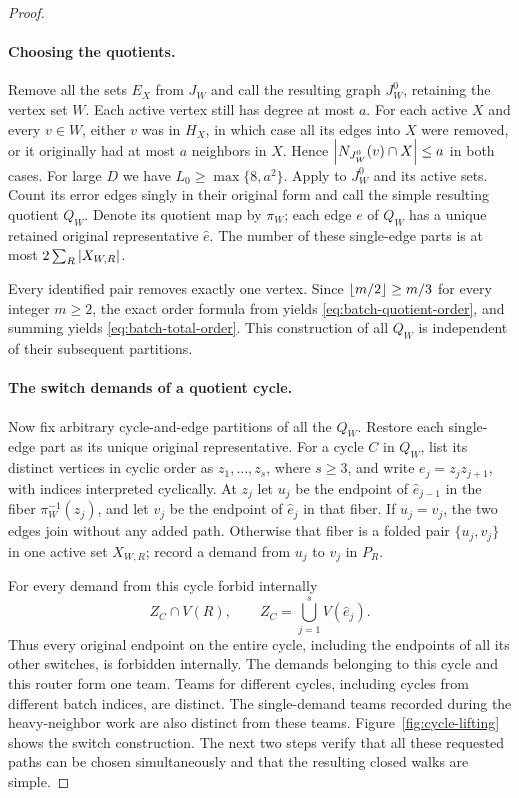 \begin{proof}
\paragraph{Choosing the quotients.}
Remove all the sets $E_X$ from $J_W$ and call the resulting graph $J_W^0$,
retaining the vertex set $W$.  Each active vertex still has degree at
most $a$.  For each active $X$ and every $v\in W$, either $v$ was in
$H_X$, in which case all its edges into $X$ were removed, or it originally
had at most $a$ neighbors in $X$.  Hence
$\left|N_{J_W^0}(v)\cap X\right|\le a$ in both cases.
For large $D$ we have $L_0\ge\max\{8,a^2\}$.  Apply
 to $J_W^0$ and its active sets.  Count its error
edges singly in their original form and call the simple resulting
quotient $Q_W$.  Denote its quotient map by $\pi_W$; each edge $e$ of
$Q_W$ has a unique retained original representative $\widehat e$.
The number of these single-edge parts is at most
$2\sum_R\left|X_{W,R}\right|$.

Every identified pair removes exactly one vertex.  Since
$\left\lfloor m/2\right\rfloor\ge m/3$ for every integer $m\ge2$, the exact order formula
from  yields
\eqref{eq:batch-quotient-order}, and summing yields
\eqref{eq:batch-total-order}.  This construction of all $Q_W$ is
independent of their subsequent partitions.

\paragraph{The switch demands of a quotient cycle.}
Now fix arbitrary cycle-and-edge partitions of all the $Q_W$.  Restore
each single-edge part as its unique original representative.  For a
cycle $C$ in $Q_W$, list its distinct vertices in cyclic order as
$z_1,\ldots,z_s$, where $s\ge3$, and write $e_j=z_jz_{j+1}$, with
indices interpreted cyclically.  At $z_j$ let $u_j$ be the endpoint of
$\widehat e_{j-1}$ in the fiber $\pi_W^{-1}(z_j)$, and let $v_j$ be
the endpoint of $\widehat e_j$ in that fiber.  If $u_j=v_j$, the two
edges join without any added path.  Otherwise that fiber is a folded
pair $\{u_j,v_j\}$ in one active set $X_{W,R}$; record a demand from
$u_j$ to $v_j$ in $P_R$.

For every demand from this cycle forbid internally
\[
 Z_C\cap V(R),\qquad
 Z_C=\bigcup_{j=1}^s V(\widehat e_j).
\]
Thus every original endpoint on the entire cycle, including the
endpoints of all its other switches, is forbidden internally.  The
demands belonging to this cycle and this router form one team.  Teams
for different cycles, including cycles from different batch indices,
are distinct.  The single-demand teams recorded during the heavy-neighbor
work are also distinct from these teams.
Figure~\ref{fig:cycle-lifting} shows the switch construction. The
next two steps verify that all these requested paths can be chosen
simultaneously and that the resulting closed walks are simple.


\end{proof}
